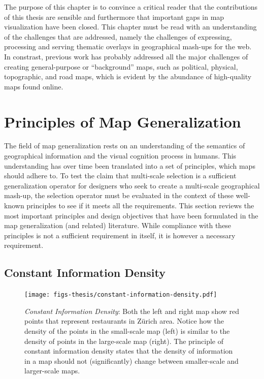 \documentclass[11pt, oneside]{report}
\begin{document}
{The purpose of this chapter is to convince a critical reader that the contributions of this thesis are sensible and furthermore that important gaps in map visualization have been closed. This chapter must be read with an understanding of the challenges that are addressed, namely the challenges of expressing, processing and serving thematic overlays in geographical mash-ups for the web. In constrast, previous work has probably addressed all the major challenges of creating general-purpose or ``background'' maps, such as political, physical, topographic, and road maps, which is evident by the abundance of high-quality maps found online. 

\section{Principles of Map Generalization}

The field of map generalization rests on an understanding of the semantics of geographical information and the visual cognition process in humans. This understanding has over time been translated into a set of principles, which maps should adhere to. To test the claim that multi-scale selection is a sufficient generalization operator for designers who seek to create a multi-scale geographical mash-up, the selection operator must be evaluated in the context of these well-known principles to see if it meets all the requirements. This section reviews the most important principles and design objectives that have been formulated in the map generalization (and related) literature. While compliance with these principles is not a sufficient requirement in itself, it is however a necessary requirement.

\subsection{Constant Information Density}

\begin{figure}[htbp]
\begin{center}
\texttt{[image: figs-thesis/constant-information-density.pdf]}
\caption{\emph{Constant Information Density}: Both the left and right map show red points that represent restaurants in Z{\"u}rich area. Notice how the density of the points in the small-scale map (left) is similar to the density of points in the large-scale map (right). The principle of constant information density states that the density of information in a map should not (significantly) change between smaller-scale and larger-scale maps.}
\label{fig:state:of:the:art:constant:information:density}
\end{center}
\vspace*{-4ex}
\end{figure}

}
\end{document}
